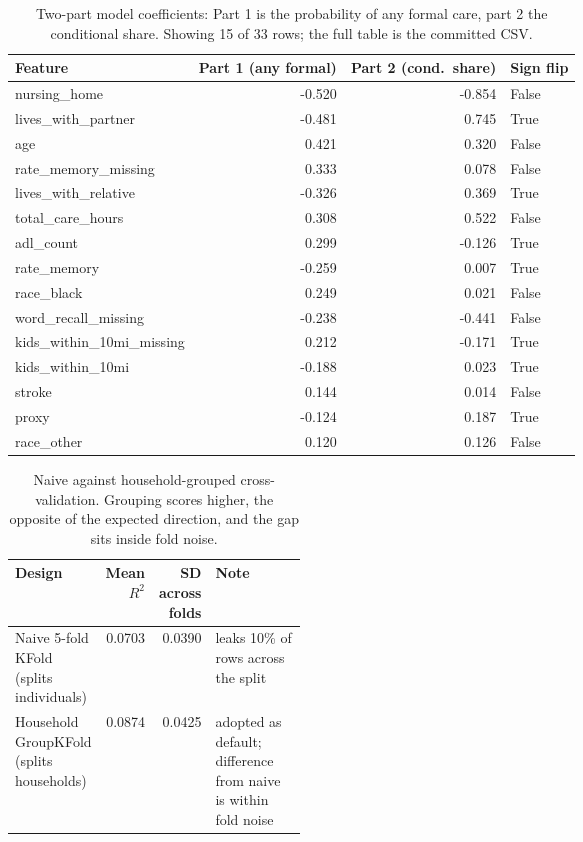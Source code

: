 \documentclass[9pt,twoside]{pnas-new}
\begin{document}
\begin{table}[!ht]
\centering
\caption{Two-part model coefficients: Part 1 is the probability of any formal care, part 2 the conditional share. Showing 15 of 33 rows; the full table is the committed CSV.}
\label{tab:b-2pcoef}
\footnotesize
\begin{tabular}{lrrl}
\toprule
Feature & Part 1 (any formal) & Part 2 (cond.\ share) & Sign flip \\
\midrule
nursing\_home & -0.520 & -0.854 & False \\
lives\_with\_partner & -0.481 & 0.745 & True \\
age & 0.421 & 0.320 & False \\
rate\_memory\_missing & 0.333 & 0.078 & False \\
lives\_with\_relative & -0.326 & 0.369 & True \\
total\_care\_hours & 0.308 & 0.522 & False \\
adl\_count & 0.299 & -0.126 & True \\
rate\_memory & -0.259 & 0.007 & True \\
race\_black & 0.249 & 0.021 & False \\
word\_recall\_missing & -0.238 & -0.441 & False \\
kids\_within\_10mi\_missing & 0.212 & -0.171 & True \\
kids\_within\_10mi & -0.188 & 0.023 & True \\
stroke & 0.144 & 0.014 & False \\
proxy & -0.124 & 0.187 & True \\
race\_other & 0.120 & 0.126 & False \\
\bottomrule
\end{tabular}
\end{table}

\begin{table}[!ht]
\centering
\caption{Naive against household-grouped cross-validation. Grouping scores higher, the opposite of the expected direction, and the gap sits inside fold noise.}
\label{tab:b-cv}
\footnotesize
\begin{tabular}{lrrp{0.34\linewidth}}
\toprule
Design & Mean $R^2$ & SD across folds & Note \\
\midrule
Naive 5-fold KFold (splits individuals) & 0.0703 & 0.0390 & leaks 10\% of rows across the split \\
Household GroupKFold (splits households) & 0.0874 & 0.0425 & adopted as default; difference from naive is within fold noise \\
\bottomrule
\end{tabular}
\end{table}
\end{document}
